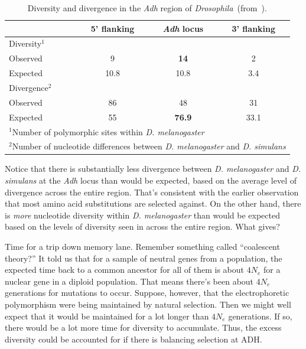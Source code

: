 \begin{table}
\begin{center}
\begin{tabular}{l|ccc}
\hline\hline
         & 5' flanking & {\it Adh\/} locus & 3' flanking \\
\hline
Diversity$^1$ \\
\quad Observed & 9     & {\bf 14}   & 2    \\
\quad Expected & 10.8  & 10.8 & 3.4  \\
Divergence$^2$ \\
\quad Observed & 86    & 48   & 31   \\
\quad Expected & 55    & {\bf 76.9} & 33.1 \\
\hline
\multicolumn{4}{l}{$^1$Number of polymorphic sites within {\it
         D. melanogaster\/}} \\
\multicolumn{4}{l}{$^2$Number of nucleotide differences between {\it
         D. melanogaster\/} and {\it D. simulans}}
\end{tabular}
\end{center}
\caption{Diversity and divergence in the {\it Adh\/} region of {\it
    Drosophila}~(from~\cite{Kreitman-Aguade86}).}\label{table:ka}
\end{table}

Notice that there is substantially less divergence between {\it
  D. melanogaster\/} and {\it D. simulans\/} at the {\it Adh\/} locus
than would be expected, based on the average level of divergence
across the entire region. That's consistent with the earlier
observation that most amino acid substitutions are selected
against. On the other hand, there is {\it more\/} nucleotide diversity
within {\it D. melanogaster\/} than would be expected based on the
levels of diversity seen in across the entire region. What gives?

Time for a trip down memory lane. Remember something called
``coalescent theory?'' It told us that for a sample of neutral genes
from a population, the expected time back to a common ancestor for all
of them is about $4N_e$ for a nuclear gene in a diploid
population. That means there's been about $4N_e$ generations for
mutations to occur. Suppose, however, that the electrophoretic
polymorphism were being maintained by natural selection. Then we might
well expect that it would be maintained for a lot longer than $4N_e$
generations. If so, there would be a lot more time for diversity to
accumulate. Thus, the excess diversity could be accounted for if there
is balancing selection at ADH.

